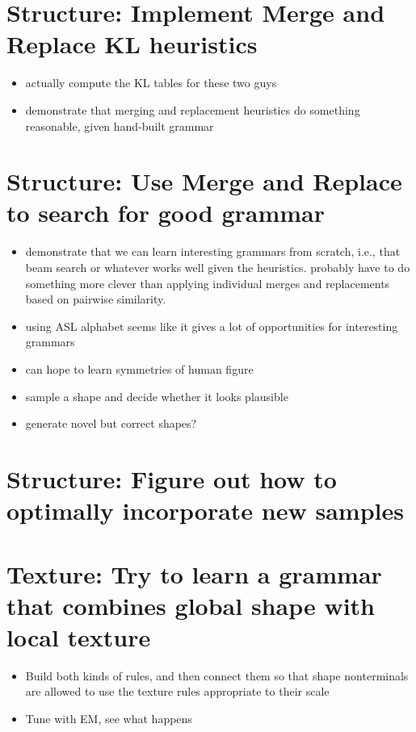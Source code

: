 \documentclass{book}
\begin{document}
\section{Structure: Implement Merge and Replace KL heuristics}
\label{sec-7_17}

\begin{itemize}
\item actually compute the KL tables for these two guys
\item demonstrate that merging and replacement heuristics do something
    reasonable, given hand-built grammar
\end{itemize}
\section{Structure: Use Merge and Replace to search for good grammar}
\label{sec-7_18}

\begin{itemize}
\item demonstrate that we can learn interesting grammars from scratch,
    i.e., that beam search or whatever works well given the
    heuristics. probably have to do something more clever than
    applying individual merges and replacements based on pairwise
    similarity.
\item using ASL alphabet seems like it gives a lot of opportunities for
    interesting grammars
\item can hope to learn symmetries of human figure
\item sample a shape and decide whether it looks plausible
\item generate novel but correct shapes?
\end{itemize}
\section{Structure: Figure out how to optimally incorporate new samples}
\label{sec-7_19}
\section{Texture: Try to learn a grammar that combines global shape with local texture}
\label{sec-7_20}


\begin{itemize}
\item Build both kinds of rules, and then connect them so that shape
    nonterminals are allowed to use the texture rules appropriate to
    their scale
\item Tune with EM, see what happens
\end{itemize}
\end{document}
